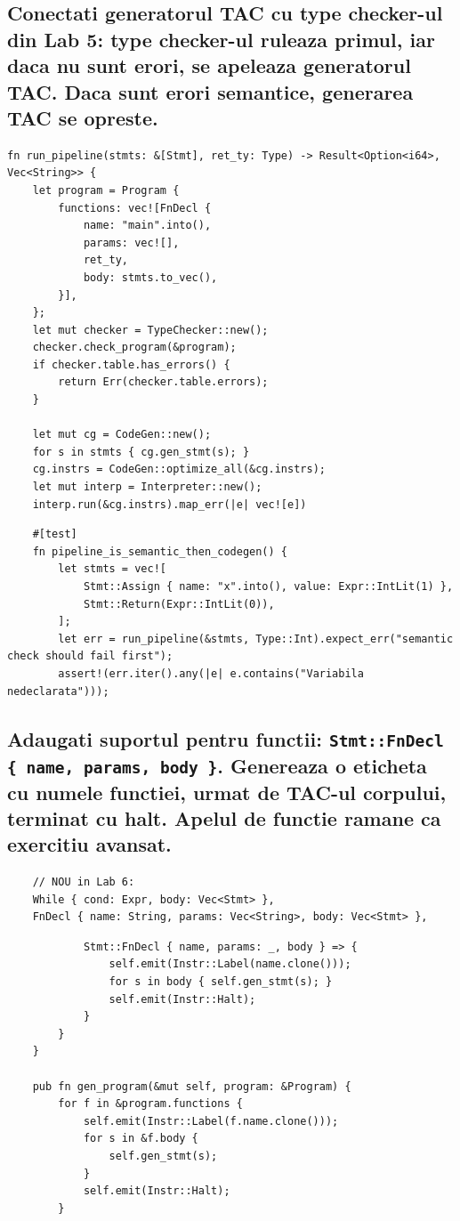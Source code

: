 \documentclass[11pt]{article}
\begin{document}
\subsection{Conectati generatorul TAC cu type checker-ul din Lab 5: type checker-ul ruleaza primul, iar daca nu sunt erori, se apeleaza generatorul TAC. Daca sunt erori semantice, generarea TAC se opreste.}
\label{sec:org651742b}
\begin{verbatim}
fn run_pipeline(stmts: &[Stmt], ret_ty: Type) -> Result<Option<i64>, Vec<String>> {
    let program = Program {
        functions: vec![FnDecl {
            name: "main".into(),
            params: vec![],
            ret_ty,
            body: stmts.to_vec(),
        }],
    };
    let mut checker = TypeChecker::new();
    checker.check_program(&program);
    if checker.table.has_errors() {
        return Err(checker.table.errors);
    }

    let mut cg = CodeGen::new();
    for s in stmts { cg.gen_stmt(s); }
    cg.instrs = CodeGen::optimize_all(&cg.instrs);
    let mut interp = Interpreter::new();
    interp.run(&cg.instrs).map_err(|e| vec![e])
\end{verbatim}
\begin{verbatim}
    #[test]
    fn pipeline_is_semantic_then_codegen() {
        let stmts = vec![
            Stmt::Assign { name: "x".into(), value: Expr::IntLit(1) },
            Stmt::Return(Expr::IntLit(0)),
        ];
        let err = run_pipeline(&stmts, Type::Int).expect_err("semantic check should fail first");
        assert!(err.iter().any(|e| e.contains("Variabila nedeclarata")));
\end{verbatim}
\subsection{Adaugati suportul pentru functii: \texttt{Stmt::FnDecl \{ name, params, body \}}. Genereaza o eticheta cu numele functiei, urmat de TAC-ul corpului, terminat cu halt. Apelul de functie ramane ca exercitiu avansat.}
\label{sec:org2028315}
\begin{verbatim}
    // NOU in Lab 6:
    While { cond: Expr, body: Vec<Stmt> },
    FnDecl { name: String, params: Vec<String>, body: Vec<Stmt> },
\end{verbatim}
\begin{verbatim}
            Stmt::FnDecl { name, params: _, body } => {
                self.emit(Instr::Label(name.clone()));
                for s in body { self.gen_stmt(s); }
                self.emit(Instr::Halt);
            }
        }
    }

    pub fn gen_program(&mut self, program: &Program) {
        for f in &program.functions {
            self.emit(Instr::Label(f.name.clone()));
            for s in &f.body {
                self.gen_stmt(s);
            }
            self.emit(Instr::Halt);
        }
\end{verbatim}
\end{document}
